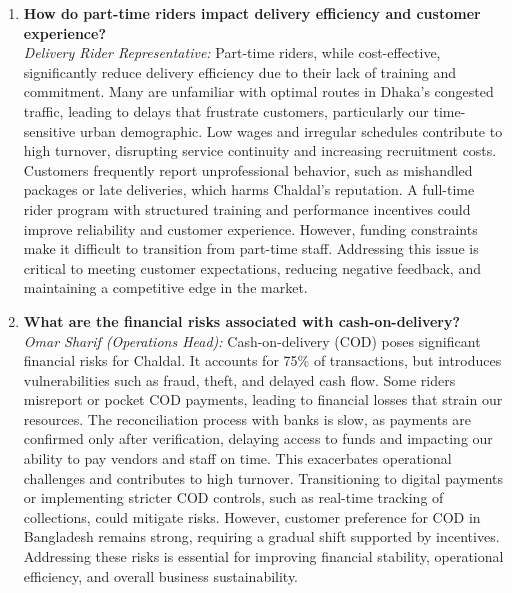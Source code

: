 \documentclass[12pt,a4paper]{article}
\begin{document}
\begin{enumerate}
    \item \textbf{How do part-time riders impact delivery efficiency and customer experience?} \\
    \textit{Delivery Rider Representative:} Part-time riders, while cost-effective, significantly reduce delivery efficiency due to their lack of training and commitment. Many are unfamiliar with optimal routes in Dhaka’s congested traffic, leading to delays that frustrate customers, particularly our time-sensitive urban demographic. Low wages and irregular schedules contribute to high turnover, disrupting service continuity and increasing recruitment costs. Customers frequently report unprofessional behavior, such as mishandled packages or late deliveries, which harms Chaldal’s reputation. A full-time rider program with structured training and performance incentives could improve reliability and customer experience. However, funding constraints make it difficult to transition from part-time staff. Addressing this issue is critical to meeting customer expectations, reducing negative feedback, and maintaining a competitive edge in the market.

    \item \textbf{What are the financial risks associated with cash-on-delivery?} \\
    \textit{Omar Sharif (Operations Head):} Cash-on-delivery (COD) poses significant financial risks for Chaldal. It accounts for 75\% of transactions, but introduces vulnerabilities such as fraud, theft, and delayed cash flow. Some riders misreport or pocket COD payments, leading to financial losses that strain our resources. The reconciliation process with banks is slow, as payments are confirmed only after verification, delaying access to funds and impacting our ability to pay vendors and staff on time. This exacerbates operational challenges and contributes to high turnover. Transitioning to digital payments or implementing stricter COD controls, such as real-time tracking of collections, could mitigate risks. However, customer preference for COD in Bangladesh remains strong, requiring a gradual shift supported by incentives. Addressing these risks is essential for improving financial stability, operational efficiency, and overall business sustainability.


\end{enumerate}
\end{document}
